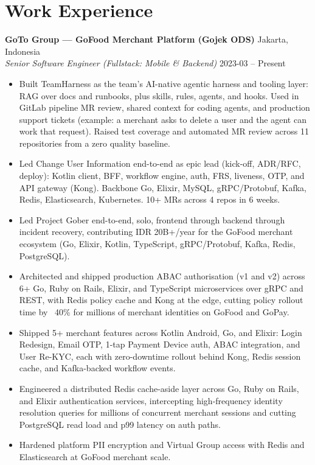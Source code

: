 \documentclass[11pt]{article}
\begin{document}
\section*{Work Experience}
\textbf{GoTo Group — GoFood Merchant Platform (Gojek ODS)} \hfill Jakarta, Indonesia\\
\textit{Senior Software Engineer (Fullstack: Mobile \& Backend)} \hfill 2023-03 -- Present\\
\begin{itemize}
\item Built TeamHarness as the team's AI-native agentic harness and tooling layer: RAG over docs and runbooks, plus skills, rules, agents, and hooks. Used in GitLab pipeline MR review, shared context for coding agents, and production support tickets (example: a merchant asks to delete a user and the agent can work that request). Raised test coverage and automated MR review across 11 repositories from a zero quality baseline.
\item Led Change User Information end-to-end as epic lead (kick-off, ADR/RFC, deploy): Kotlin client, BFF, workflow engine, auth, FRS, liveness, OTP, and API gateway (Kong). Backbone Go, Elixir, MySQL, gRPC/Protobuf, Kafka, Redis, Elasticsearch, Kubernetes. 10+ MRs across 4 repos in 6 weeks.
\item Led Project Gober end-to-end, solo, frontend through backend through incident recovery, contributing IDR 20B+/year for the GoFood merchant ecosystem (Go, Elixir, Kotlin, TypeScript, gRPC/Protobuf, Kafka, Redis, PostgreSQL).
\item Architected and shipped production ABAC authorisation (v1 and v2) across 6+ Go, Ruby on Rails, Elixir, and TypeScript microservices over gRPC and REST, with Redis policy cache and Kong at the edge, cutting policy rollout time by ~40\% for millions of merchant identities on GoFood and GoPay.
\item Shipped 5+ merchant features across Kotlin Android, Go, and Elixir: Login Redesign, Email OTP, 1-tap Payment Device auth, ABAC integration, and User Re-KYC, each with zero-downtime rollout behind Kong, Redis session cache, and Kafka-backed workflow events.
\item Engineered a distributed Redis cache-aside layer across Go, Ruby on Rails, and Elixir authentication services, intercepting high-frequency identity resolution queries for millions of concurrent merchant sessions and cutting PostgreSQL read load and p99 latency on auth paths.
\item Hardened platform PII encryption and Virtual Group access with Redis and Elasticsearch at GoFood merchant scale.
\end{itemize}
\end{document}
